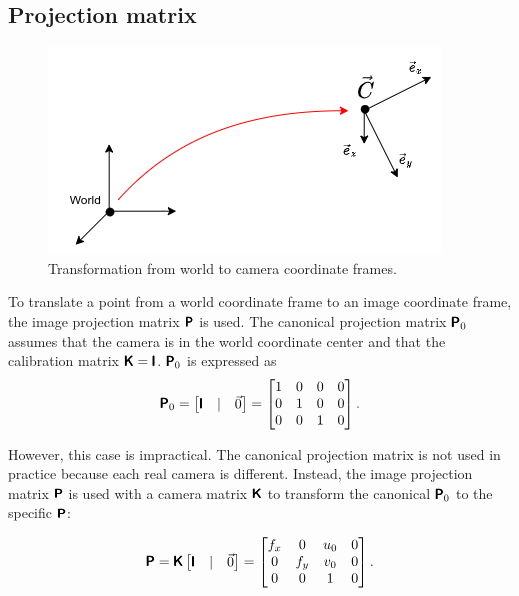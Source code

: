 \subsection{Projection matrix}

\begin{figure}[ht]
    \centering
    \includegraphics[width=.5\textwidth]{graphics/frames.png}
    \caption{Transformation from world to camera coordinate frames.}
    \label{fig:frames}
\end{figure}

To translate a point from a world coordinate frame to an image coordinate frame, the image projection matrix $\pmb{\mathsf{P}}$ is used. 
The canonical projection matrix $\pmb{\mathsf{P}}_0$ assumes that the camera is in the world coordinate center and that the calibration matrix $\pmb{\mathsf{K}} = \pmb{\mathsf{I}}$.
$\pmb{\mathsf{P}}_0$ is expressed as
\begin{equation}
\pmb{\mathsf{P}}_0 = \begin{bmatrix} \pmb{\mathsf{I}} & | & \vec{0} \end{bmatrix} = 
    \begin{bmatrix}
    1 & 0 & 0 & 0 \\
    0 & 1 & 0 & 0 \\
    0 & 0 & 1 & 0 \\
    \end{bmatrix}.
\end{equation}

However, this case is impractical. 
The canonical projection matrix is not used in practice because each real camera is different. 
Instead, the image projection matrix $\pmb{\mathsf{P}}$ is used with a camera matrix $\pmb{\mathsf{K}}$ to transform the canonical $\pmb{\mathsf{P}}_0$ to the specific $\pmb{\mathsf{P}}$:

\begin{equation}
\pmb{\mathsf{P}} = \pmb{\mathsf{K}} \begin{bmatrix} \pmb{\mathsf{I}} & | & \vec{0} \end{bmatrix} = 
    \begin{bmatrix} 
    f_x & 0 & u_0 & 0 \\
    0 & f_y & v_0 & 0 \\ 
    0 & 0 & 1 & 0 \\
    \end{bmatrix}.
\end{equation}

